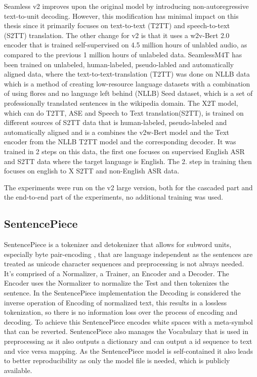 Seamless v2 improves upon the original model by introducing non-autoregressive text-to-unit decoding. However, this modification has minimal impact on this thesis since it primarily focuses on text-to-text (T2TT) and speech-to-text (S2TT) translation. 
The other change for v2 is that it uses a w2v-Bert 2.0 \cite{chung2021w2vbertcombiningcontrastivelearning} encoder that is trained self-supervised on 4.5 million hours of unlabled audio, as compared to the previous 1 million hours of unlabeled data.
SeamlessM4T has been trained on unlabeled, human-labeled, pseudo-labled and automatically aligned data, where the text-to-text-translation (T2TT) was done on NLLB data \cite{nllbteam2022languageleftbehindscaling}
which is a method of creating low-resource language datasets with a combination of using flores \cite{guzmán2019floresevaluationdatasetslowresource} and no language left behind (NLLB) Seed dataset, which is a set of professionally translated sentences in the wikipedia domain. 
The X2T model, which can do T2TT, ASE and Speech to Text translation(S2TT), is trained on different sources of S2TT data that is human-labeled, pseudo-labeled and automatically aligned and is a combines the v2w-Bert model and the Text encoder from the NLLB T2TT model and the corresponding decoder.
It was trained in 2 steps on this data, the first one focuses on supervised English ASR and S2TT data where the target language is English. 
The 2. step in training then focuses on english to X S2TT and non-English ASR data.

The experiments were run on the v2 large version, both for the cascaded part and the end-to-end part of the experiments, no additional training was used.

\subsection{SentencePiece}
SentencePiece \cite{kudo-richardson-2018-sentencepiece} is a tokenizer and detokenizer that allows for subword units, especially byte pair-encoding \cite{sennrich-etal-2016-neural}, that are language independent as the sentences are treated as unicode character sequences and preprocessing is not always needed. 
It's comprised of a Normalizer, a Trainer, an Encoder and a Decoder. 
The Encoder uses the Normalizer to normalize the Test and then tokenizes the sentence. 
In the SentencePiece implementation the Decoding is considered the inverse operation of Encoding of normalized text, this results in a lossless tokenization, so there is no information loss over the process of encoding and decoding. 
To achieve this SentencePiece encodes white spaces with a meta-symbol that can be reverted. 
SentencePiece also manages the Vocabulary that is used in preprocessing as it also outputs a dictionary and can output a id sequence to text and vice versa mapping. 
As the SentencePiece model is self-contained it also leads to better reproducibility as only the model file is needed, which is publicly available. 


